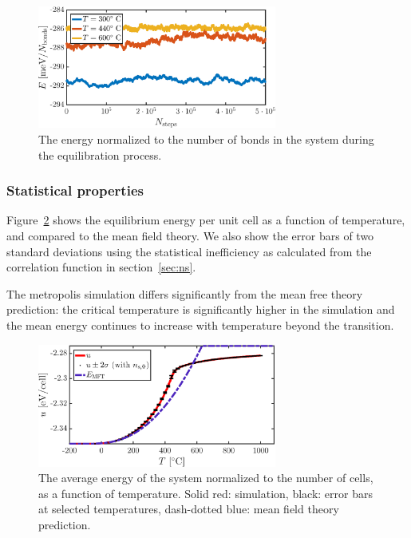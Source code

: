 \begin{figure}[!ht]
\begin{center}
  \includegraphics[width=0.7\textwidth]{../figures/equilibration} 
  \caption{The energy normalized to the number of bonds in the system during the equilibration process.}
  \label{fig:T2:equil}
\end{center}
\end{figure}

\subsubsection*{Statistical properties}
Figure~\ref{fig:U} shows the equilibrium energy per unit cell as a function of temperature, and compared to the mean field theory. We also show the error bars of two standard deviations using the statistical inefficiency  as calculated from the correlation function in section~\ref{sec:ns}. 


The metropolis simulation differs significantly from the mean free theory prediction: the critical temperature is significantly higher in the simulation and the mean energy continues to increase with temperature beyond the transition. 

\begin{figure}[!ht]
\begin{center}
  \includegraphics[width=0.7\textwidth]{../figures/U} 
  \caption{The average energy of the system normalized to the number of cells, as a function of temperature. Solid red: simulation, black: error bars at selected temperatures, dash-dotted blue: mean field theory prediction.}
  \label{fig:U}
\end{center}
\end{figure}


